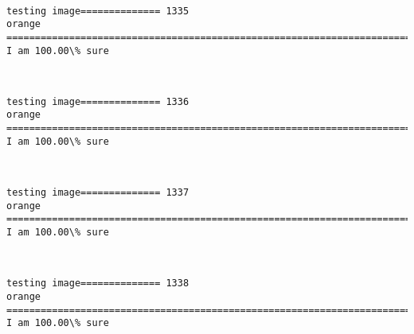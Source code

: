 \documentclass[11pt]{article}
\begin{document}
    \begin{center}
    \end{center}
    { \hspace*{\fill} \\}
    
    \begin{Verbatim}[commandchars=\\\{\}]
testing image============== 1335
orange
============================================================================
I am 100.00\% sure

    \end{Verbatim}

    \begin{center}
    \end{center}
    { \hspace*{\fill} \\}
    
    \begin{Verbatim}[commandchars=\\\{\}]
testing image============== 1336
orange
============================================================================
I am 100.00\% sure

    \end{Verbatim}

    \begin{center}
    \end{center}
    { \hspace*{\fill} \\}
    
    \begin{Verbatim}[commandchars=\\\{\}]
testing image============== 1337
orange
============================================================================
I am 100.00\% sure

    \end{Verbatim}

    \begin{center}
    \end{center}
    { \hspace*{\fill} \\}
    
    \begin{Verbatim}[commandchars=\\\{\}]
testing image============== 1338
orange
============================================================================
I am 100.00\% sure

    \end{Verbatim}
\end{document}
